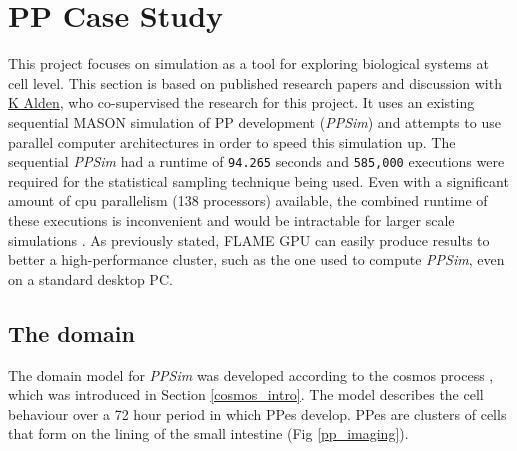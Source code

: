 \documentclass{UoYCSproject}
\begin{document}
\section{\gls{PP} Case Study}
\label{ppsim}
This project focuses on simulation as a tool for exploring biological systems at cell level.
This section is based on published research papers \cite{kieran_thesis, kieran_methodology, kieran_results, kieran_machine_learning, spartan} and discussion with \href{https://www.york.ac.uk/computational-immunology/members/kieran/}{K Alden}, who co-supervised the research for this project.
It uses an existing sequential \gls{MASON} simulation of \gls{PP} development \cite{kieran_thesis, kieran_methodology, spartan} (\textit{PPSim}) and attempts to use parallel computer architectures in order to speed this simulation up.
The sequential \textit{PPSim} had a runtime of \texttt{94.265} seconds and \texttt{585,000} executions were required for the statistical sampling technique being used.
Even with a significant amount of \gls{cpu} parallelism (138 processors) available, the combined runtime of these executions is inconvenient and would be intractable for larger scale simulations \cite{kieran_machine_learning}.
As previously stated, \gls{FLAME GPU} can easily produce results to better a high-performance cluster, such as the one used to compute \textit{PPSim}, even on a standard desktop PC.

\subsection{The \gls{domain}}
The domain model for \textit{PPSim} was developed according to the \acrshort{cosmos} process \cite{cosmos}, which was introduced in Section \ref{cosmos_intro}.
The model describes the cell behaviour over a 72 hour period in which \gls{PP}es develop.
\gls{PP}es are clusters of cells that form on the lining of the small intestine (Fig \ref{pp_imaging}).
\end{document}
